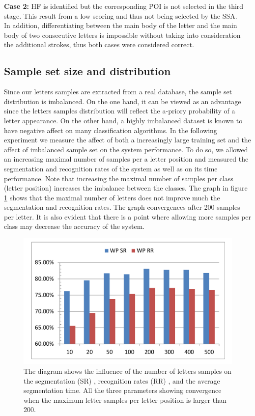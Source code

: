 \documentclass[journal,compsoc]{IEEEtran}
\begin{document}
\textbf{Case 2:} HF is identified but the corresponding POI is not selected in the third stage. This result from a low scoring and thus not being selected by the SSA.\\

In addition, differentiating between the main body of the letter  and the main body of two consecutive  letters is impossible without taking into consideration the additional strokes, thus both cases were considered correct.\\

\subsection{Sample set size and distribution}
Since our letters samples are extracted from a real database, the sample set distribution is imbalanced. On the one hand, it can be viewed as an advantage since the letters samples  distribution will reflect the a-priory probability of a letter appearance. On the other hand, a highly imbalanced dataset is known to have negative affect on many classification algorithms.
In the following experiment we measure the affect of both a increasingly large training set and the affect of imbalanced sample set on the system performance.
To do so, we allowed an increasing maximal number of samples per a letter position and measured the segmentation and recognition rates of the system as well as on its time performance. Note that increasing the maximal number of samples per class (letter position) increases the imbalance between the classes. The graph in figure \ref{fig:num_letter_impact} shows that the maximal number of letters does not improve much the segmentation and recognition rates. The graph convergences after 200 samples per letter. It is also evident that there is a point where allowing more samples per class may decrease the accuracy of the system.

\begin{figure}
\centering
\includegraphics[width=1\columnwidth]{./figures/num_letter_impact}
\caption{The diagram shows the influence of the number of letters samples on the segmentation (SR) , recognition rates (RR) , and the average segmentation time. All the three parameters showing convergence when the maximum letter samples per letter position is larger than 200. }
\label{fig:num_letter_impact}
\end{figure}
\end{document}
